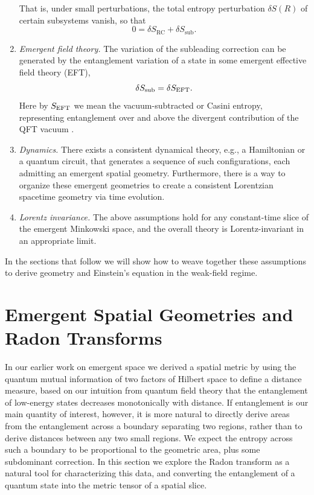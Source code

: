 \documentclass[%
12pt,preprint,
nofootinbib,
amsmath,amssymb,
aps,
prd,
showpacs,
superscriptaddress
]{revtex4-2}
\begin{document}
\begin{enumerate}[label=\textnormal{(A\arabic*)}]
That is, under small perturbations, the total entropy perturbation $\delta S(R)$ of certain subsystems vanish, so that \label{itm:4}
\begin{equation}
  0 = \delta S_{\mathrm{RC}} +\delta S_\mathrm{sub}.
\end{equation}
 \item \emph{Emergent field theory.}
 The variation of the subleading correction can be generated by the entanglement variation of a state in some emergent effective field theory (EFT), \label{itm:5} 
 \begin{equation}
 \delta S_{\rm sub}=\delta S_{\rm EFT}.
 \end{equation}
Here by $S_{\rm EFT}$ we mean the vacuum-subtracted or Casini entropy, representing entanglement over and above the divergent contribution of the QFT vacuum \cite{Casini:2008cr,Bousso:2014sda,Bousso:2014uxa}.
 \item \emph{Dynamics.}
 There exists a consistent dynamical theory, e.g., a Hamiltonian or a quantum circuit, that generates a sequence of such configurations, each admitting an emergent spatial geometry. Furthermore, there is a  way to organize these emergent geometries to create a consistent Lorentzian spacetime geometry via time evolution. 
\label{itm:6}
 \item \emph{Lorentz invariance.}
The above assumptions hold for any constant-time slice of the emergent Minkowski space, and the overall theory is Lorentz-invariant in an appropriate limit. \label{itm:7}
\end{enumerate}

In the sections that follow we will show how to weave together these assumptions to derive geometry and Einstein's equation in the weak-field regime.

\section{Emergent Spatial Geometries and Radon Transforms}\label{sec:emergentspace}

In our earlier work on emergent space \cite{Cao:2016mst} we derived a spatial metric by using the quantum mutual information of two factors of Hilbert space to define a distance measure, based on our intuition from quantum field theory that the entanglement of low-energy states decreases monotonically with distance.
If entanglement is our main quantity of interest, however, it is more natural to directly derive areas from the entanglement across a boundary separating two regions, rather than to derive distances between any two small regions. 
We expect the entropy across such a boundary to be proportional to the geometric area, plus some subdominant correction.
In this section we explore the Radon transform as a natural tool for characterizing this data, and converting the entanglement of a quantum state into the metric tensor of a spatial slice.
\end{document}
